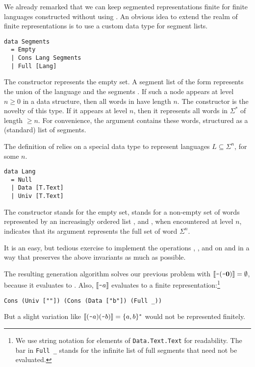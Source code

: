 We already remarked that we can keep segmented representations finite
for finite languages constructed without using . An
obvious idea to extend the realm of finite representations is to use a
custom data type  for segment lists.
\begin{lstlisting}
data Segments
  = Empty
  | Cons Lang Segments
  | Full [Lang]
\end{lstlisting}
The constructor  represents the empty set. A segment list
of the form  represents the union of the language
 and the segments . If such a  node
appears at level $n\ge0$ in a  data structure, then all
words in  have length $n$. The constructor  is
the novelty of this type. If it appears at level $n$, then it
represents all words in $\Sigma^*$ of length $\ge n$. For convenience,
the argument  contains these words, structured as a
(standard) list of segments.

The definition of  relies on a special data type  to
represent languages $L\subseteq \Sigma^n$,  for some $n$.
\begin{lstlisting}
data Lang
  = Null
  | Data [T.Text]
  | Univ [T.Text]
\end{lstlisting}
The constructor  stands for the empty set, 
stands for a non-empty set of words represented by an increasingly
ordered list , and , when encountered at level
$n$, indicates that its argument  represents the full set of
word $\Sigma^n$.

It is an easy, but tedious exercise to implement the operations
, , and  on 
and  in a way that preserves the above invariants as
much as possible.

The resulting generation algorithm solves our previous problem 
with $\llbracket\texttt{\textasciitilde}{(\texttt{\textasciitilde}{\mathbf0})}\rrbracket = \emptyset$,
because it evaluates to . Also, $\llbracket\texttt{\textasciitilde}{a}\rrbracket$
evaluates to a finite representation:\footnote{We use string notation
  for elements of \lstinline{Data.Text.Text} for readability. The bar in \lstinline{Full _} stands for the infinite list of full segments that need not be evaluated.}
\begin{lstlisting}[numbers=none]
Cons (Univ [""]) (Cons (Data ["b"]) (Full _))
\end{lstlisting}
But a slight variation like
$\llbracket(\texttt{\textasciitilde}{a})(\texttt{\textasciitilde}{b})\rrbracket = \{a,b\}^*$ would not be
represented finitely.

